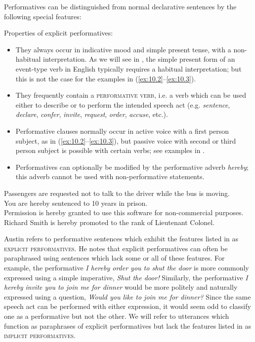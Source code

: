 Performatives can be distinguished from normal declarative sentences by the following special features:


\ea \label{ex:10.5}
Properties of explicit performatives:
\begin{itemize}
\item They always occur in indicative mood and simple present tense, with a non-habitual interpretation. As we will see in , the simple present form of an event-type verb in English typically requires a habitual interpretation; but this is not the case for the examples in (\ref{ex:10.2}--\ref{ex:10.3}).
\item They frequently contain a \textsc{performative verb}, i.e. a verb which can be used either to describe or to perform the intended speech act (e.g. \textit{sentence}, \textit{declare}, \textit{confer}, \textit{invite}, \textit{request}, \textit{order}, \textit{accuse}, etc.).
\item Performative clauses normally occur in active voice with a first person subject, as in (\ref{ex:10.2}--\ref{ex:10.3}), but passive voice with second or third person subject is possible with certain verbs; see examples in .
\item Performatives can optionally be modified by the performative adverb \textit{hereby}; this adverb cannot be used with non-performative statements.
\end{itemize}
\z

\ea \label{ex:10.6}
\ea  Passengers are requested not to talk to the driver while the bus is moving.\\
\ex You are hereby sentenced to 10 years in prison.\\
\ex Permission is hereby granted to use this software for non-commercial purposes.\\
\ex Richard Smith is hereby promoted to the rank of Lieutenant Colonel.
                       \z
\z


Austin refers to performative sentences which exhibit the features listed in  as \textsc{explicit performatives}. He notes that explicit performatives can often be paraphrased using sentences which lack some or all of these features. For example, the performative \textit{I hereby order you to shut the door} is more commonly expressed using a simple imperative, \textit{Shut the door!} Similarly, the performative \textit{I hereby invite you to join me for dinner} would be more politely and naturally expressed using a question, \textit{Would you like to join me for dinner?} Since the same speech act can be performed with either expression, it would seem odd to classify one as a performative but not the other. We will refer to utterances which function as paraphrases of explicit performatives but lack the features listed in  as \textsc{implicit performatives}.



